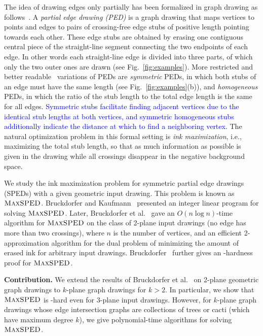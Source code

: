 \documentclass[a4paper,english,numberwithinsect]{eurocg18}
\newcommand{\maxsped}{\ensuremath{\textsc{MaxSPED}}\xspace}
\begin{document}
The idea of drawing edges only partially has been formalized in graph drawing as follows~\cite{bk-ecbe-12}. 
A \emph{partial edge drawing (PED)} is a graph drawing that maps vertices to points and edges to pairs of crossing-free edge stubs of positive length pointing towards each other.
These edge stubs are obtained by erasing one contiguous central piece of the straight-line segment connecting the two endpoints of each edge.
In other words each straight-line edge is divided into three parts, of which only the two outer ones are drawn (see Fig.~\ref{fig:examples}).
More restricted and better readable~\cite{blmt-pedhmitc-16} variations of PEDs are \emph{symmetric} PEDs, in which both stubs of an edge must have the same length (see Fig.~\ref{fig:examples}(b)), and \emph{homogeneous} PEDs, in which the ratio of the stub length to the total edge length is the same for all edges.
\textcolor{blue}{Symmetric stubs facilitate finding adjacent vertices due to the identical stub lengths at both vertices, and symmetric homogeneous stubs additionally indicate the distance at which to find a neighboring vertex.}
The natural optimization problem in this formal setting is \emph{ink maximization}, i.e., maximizing the total stub length, so that as much information as possible is given in the drawing while all crossings disappear in the negative background space. 


We study the ink maximization problem for symmetric partial edge drawings (SPEDs) with a given geometric input drawing.
This problem is known as \maxsped. 
Bruckdorfer and Kaufmann~\cite{bk-ecbe-12} presented an integer linear program for solving \maxsped. 
Later, Bruckdorfer et al.~\cite{bcgkmn-pped-17} gave an $O(n \log n)$-time algorithm for \maxsped on the class of 2-plane input drawings (no edge has more than two crossings), where $n$ is the number of vertices, and an efficient 2-approximation algorithm for the dual problem of minimizing the amount of erased ink for arbitrary input drawings.
Bruckdorfer~\cite{b-sgh-15} further gives an \NP-hardness proof for \maxsped.

\medskip

\noindent\textbf{Contribution.} We extend the results of Bruckdorfer et al.~\cite{bcgkmn-pped-17} on 2-plane geometric graph drawings to $k$-plane graph drawings for $k > 2$. 
In particular, we show that \maxsped is \NP-hard even for 3-plane input drawings. 
However, for $k$-plane graph drawings whose edge intersection graphs are collections of trees or cacti (which have maximum degree $k$), we give polynomial-time algorithms for solving \maxsped.
\end{document}
